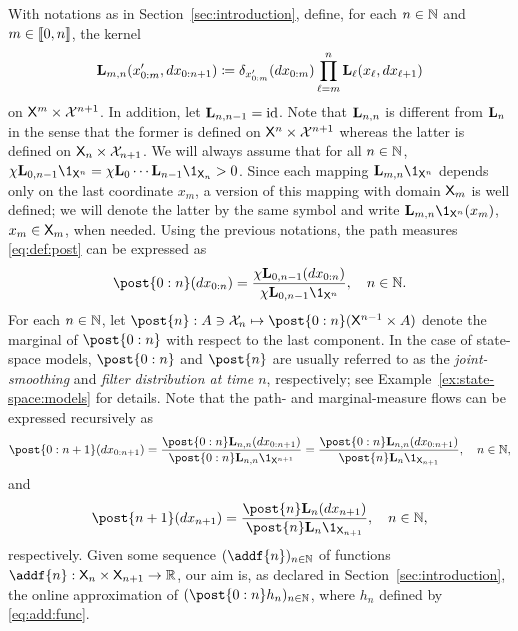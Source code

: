 With notations as in Section~\ref{sec:introduction}, define, for each $n \in \mathbb{N}$ and $m \in \llbracket 0, n \rrbracket$, the kernel 
\begin{equation} \label{eq:def:uk:products}
    \uk{m, n}(x_{0:m}', \rmd x_{0:n + 1}) \eqdef \delta_{x_{0:m}'}(\rmd x_{0:m}) \prod_{\ell = m}^n \uk{\ell}(x_\ell, \rmd x_{\ell + 1}) 
\end{equation}
on $\mathsf{X}^m \times \mathcal{X}^{n + 1}$. In addition, let $\mathbf{L}_{n, n - 1} = \operatorname{id}$. Note that $\mathbf{L}_{n, n}$ is different from $\mathbf{L}_{n}$ in the sense that the former is defined on $\mathsf{X}^n \times \mathcal{X}^{n + 1}$ whereas the latter is defined on $\mathsf{X}_n \times \mathcal{X}_{n + 1}$. We will always assume that for all $n \in \mathbb{N}$, $\chi \uk{0, n - 1} \1_{\Xset^n} = \chi \uk{0} \cdots \uk{n - 1} \1_{\Xset_n} > 0$. Since each mapping $\uk{m, n} \1_{\Xset^n}$ depends only on the last coordinate $x_m$, a version of this mapping with domain $\mathsf{X}_m$ is well defined; we will denote the latter by the same symbol and write $\uk{m, n} \1_{\Xset^n}(x_m)$, $x_m \in \mathsf{X}_m$, when needed. Using the previous notations, the path measures \eqref{eq:def:post} can be expressed as 
\begin{equation}
\label{eq:FK:path}
    \post{0:n}(\rmd x_{0:n}) = \frac{\chi \uk{0, n - 1}(\rmd x_{0:n})}{\chi \uk{0, n - 1} \1_{\Xset^n}}, \quad n \in \nset. 
\end{equation} 
For each $n \in \mathbb{N}$, let  
$ 
\post{n} : A \ni \Xfd_n \mapsto \post{0:n}(\Xset^{n - 1} \times A)
$
denote the marginal of $\post{0:n}$ with respect to the last component. In the case of state-space models, $\post{0:n}$ and $\post{n}$ are usually referred to as the \emph{joint-smoothing} and \emph{filter distribution at time $n$}, respectively; see Example~\ref{ex:state-space:models} for details. Note that the path- and marginal-measure flows can be expressed recursively as  
\begin{equation} \label{eq:recursion:FK:path}
    \post{0:n + 1}(\rmd x_{0:n + 1}) = \frac{\post{0:n} \uk{n, n}(\rmd x_{0:n + 1})}{\post{0:n} \uk{n, n} \1_{\Xset^{n + 1}}} = \frac{\post{0:n} \uk{n, n}(\rmd x_{0:n + 1})}{\post{n} \uk{n} \1_{\Xset_{n + 1}}}, \quad n \in \nset, 
\end{equation}
and 
\begin{equation} \label{eq:recursion:FK:marg}
    \post{n + 1}(\rmd x_{n + 1}) = \frac{\post{n} \uk{n}(\rmd x_{n + 1})}{\post{n} \uk{n} \1_{\Xset_{n + 1}}}, \quad n \in \nset, 
\end{equation}
respectively. Given some sequence $(\addf{n})_{n \in \nset}$ of functions $\addf{n} : \Xset_n \times \Xset_{n + 1} \to \rset$, our aim is, as declared in Section~\ref{sec:introduction}, the online approximation of $(\post{0:n} h_n)_{n \in \nset}$, where $h_n$ defined by \eqref{eq:add:func}. 

